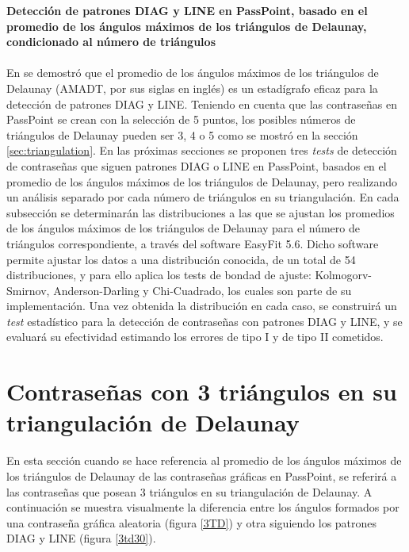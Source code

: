 \documentclass[12pt]{report}
\begin{document}
\vspace{-2em} %

\noindent\textbf{\LARGE Detección de patrones DIAG y LINE en PassPoint, basado en el promedio de los ángulos máximos de los triángulos de Delaunay, condicionado al número de triángulos}\\
\vspace{2em}
\\	
En \cite{13} se demostró que el promedio de los ángulos máximos de los triángulos de Delaunay (AMADT, por sus siglas en inglés) es un estadígrafo eficaz para la detección de patrones DIAG y LINE. Teniendo en cuenta que las contraseñas en PassPoint se crean con la selección de 5 puntos, los posibles números de triángulos de Delaunay pueden ser 3, 4 o 5 como se mostró en la sección \ref{sec:triangulation}. En las próximas secciones se proponen tres \textit{tests} de detección de contraseñas  que siguen patrones DIAG o LINE en PassPoint, basados en el promedio de los ángulos  máximos de los triángulos de Delaunay, pero  realizando un análisis separado por cada número de triángulos en su triangulación.
En cada subsección se determinarán las distribuciones a las que se ajustan los promedios de los ángulos máximos de los triángulos de Delaunay para el número de triángulos correspondiente, a través  del software EasyFit 5.6. Dicho software permite ajustar los datos a una distribución conocida, de un total de 54 distribuciones, y para ello aplica los tests de bondad de ajuste: Kolmogorv-Smirnov, Anderson-Darling y Chi-Cuadrado, los cuales son parte de su implementación. 
Una vez obtenida la distribución en cada caso, se construirá un \textit{test} estadístico para la detección de contraseñas con patrones DIAG y LINE, y se evaluará su efectividad estimando los errores de  tipo I y de tipo II cometidos.



\setcounter{section}{0}
\section{Contraseñas con 3 triángulos en su triangulación de Delaunay }
\label{sec:1}
En esta sección cuando se hace referencia  al promedio de los ángulos máximos de los triángulos de Delaunay  de las contraseñas gráficas en PassPoint, se referirá a las contraseñas que posean 3 triángulos en su triangulación de Delaunay. A continuación se muestra visualmente la diferencia entre los ángulos formados por una contraseña gráfica aleatoria (figura \ref{3TD}) y otra siguiendo los patrones DIAG y LINE (figura \ref{3td30}).
\newpage
	
\end{document}
